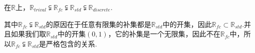 \begin{instance}
    在$\mathbb{R}$上，$\mathbb{R}_{trival}\subsetneqq\mathbb{R}_{fc}\subsetneqq\mathbb{R}_{std}\subsetneqq\mathbb{R}_{discrete}$.\par
    其中$\mathbb{R}_{fc}\subsetneqq\mathbb{R}_{std}$的原因在于任意有限集的补集都是$\mathbb{R}_{std}$中的开集，因此$\mathbb{R}_{fc}\subset \mathbb{R}_{std}$.并且如果我们取$\mathbb{R}_{std}$中的开集$(0,1)$，它的补集是一个无限集，因此不在$\mathbb{R}_{fc}$中，所以$\mathbb{R}_{fc}\subsetneqq \mathbb{R}_{std}$是严格包含的关系.
\end{instance}

